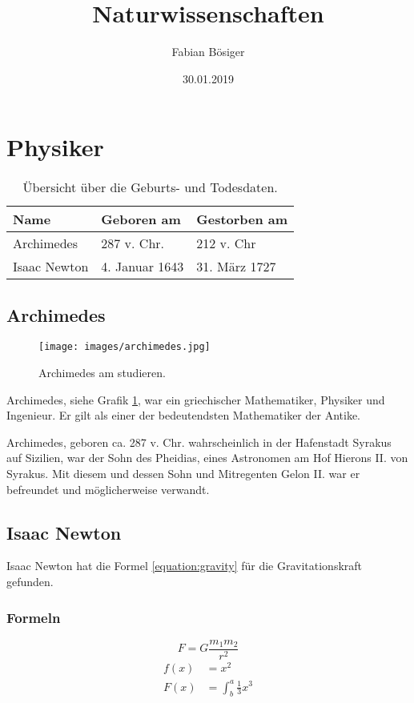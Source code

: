 \documentclass[12pt]{article}
\title{Naturwissenschaften}
\date{30.01.2019}
\author{Fabian Bösiger}
\begin{document}
	
	\maketitle

	\newpage
	\tableofcontents
	
	\newpage

	\section{Physiker}

		\begin{table}
			\begin{tabular}{l|l|l}
				\textbf{Name} & \textbf{Geboren am} & \textbf{Gestorben am}\\
				\hline
				Archimedes & 287 v. Chr. & 212 v. Chr \\
				Isaac Newton & 4. Januar 1643 & 31. März 1727
				\caption{Übersicht über die Geburts- und Todesdaten.}
				\label{table:overview}
			\end{tabular}
		\end{table}

		\subsection{Archimedes}
			\begin{figure}
				\texttt{[image: images/archimedes.jpg]}
				\caption{Archimedes am studieren.}
				\label{image:archimedes}
			\end{figure}
			Archimedes, siehe Grafik \ref{image:archimedes}, war ein griechischer Mathematiker, Physiker und Ingenieur.
			Er gilt als einer der bedeutendsten Mathematiker der Antike. \par
			Archimedes, geboren ca. 287 v. Chr. wahrscheinlich in der Hafenstadt Syrakus auf Sizilien, war der Sohn des Pheidias, eines Astronomen am Hof Hierons II. von Syrakus. Mit diesem und dessen Sohn und Mitregenten Gelon II. war er befreundet und möglicherweise verwandt. \cite{wikipedia:archimedes}
		
		\subsection{Isaac Newton}
			Isaac Newton hat die Formel \ref{equation:gravity} für die Gravitationskraft gefunden.
			\subsubsection{Formeln}
				\begin{equation}
					F = G\frac{m_1m_2}{r^2}
					\label{equation:gravity}
				\end{equation}
				\begin{align}
					f(x) &= x^2 \\
					F(x) &= \int^a_b \frac{1}{3}x^3
				\end{align}
				
\end{document}
